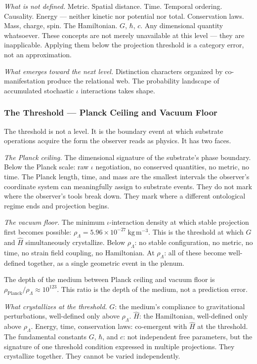 \documentclass[11pt,letterpaper]{article}
\begin{document}
\emph{What is not defined.} Metric. Spatial distance. Time. Temporal ordering. Causality. Energy --- neither kinetic nor potential nor total. Conservation laws. Mass, charge, spin. The Hamiltonian. \(G\), \(\hbar\), \(c\). Any dimensional quantity whatsoever. These concepts are not merely unavailable at this level --- they are inapplicable. Applying them below the projection threshold is a category error, not an approximation.

\emph{What emerges toward the next level.} Distinction characters organized by co-manifestation produce the relational web. The probability landscape of accumulated stochastic \(\iota\) interactions takes shape.

\subsubsection{The Threshold --- Planck Ceiling and Vacuum Floor}
\label{sec:org8bf83b3}

The threshold is not a level. It is the boundary event at which substrate operations acquire the form the observer reads as physics. It has two faces.

\emph{The Planck ceiling.} The dimensional signature of the substrate's phase boundary. Below the Planck scale: raw \(\iota\) negotiation, no conserved quantities, no metric, no time. The Planck length, time, and mass are the smallest intervals the observer's coordinate system can meaningfully assign to substrate events. They do not mark where the observer's tools break down. They mark where a different ontological regime ends and projection begins.

\emph{The vacuum floor.} The minimum \(\iota\)-interaction density at which stable projection first becomes possible: \(\rho_\Lambda = 5.96 \times 10^{-27}\ \mathrm{kg\,m^{-3}}\). This is the threshold at which \(G\) and \(\hat{H}\) simultaneously crystallize. Below \(\rho_\Lambda\): no stable configuration, no metric, no time, no strain field coupling, no Hamiltonian. At \(\rho_\Lambda\): all of these become well-defined together, as a single geometric event in the plenum.

The depth of the medium between Planck ceiling and vacuum floor is \(\rho_{\mathrm{Planck}}/\rho_\Lambda \approx 10^{123}\). This ratio is the depth of the medium, not a prediction error.

\emph{What crystallizes at the threshold.} \(G\): the medium's compliance to gravitational perturbations, well-defined only above \(\rho_\Lambda\). \(\hat{H}\): the Hamiltonian, well-defined only above \(\rho_\Lambda\). Energy, time, conservation laws: co-emergent with \(\hat{H}\) at the threshold. The fundamental constants \(G\), \(\hbar\), and \(c\): not independent free parameters, but the signature of one threshold condition expressed in multiple projections. They crystallize together. They cannot be varied independently.
\end{document}
